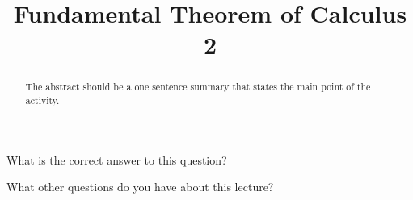 \documentclass{ximera}
\title{Fundamental Theorem of Calculus 2}
\begin{document}
\begin{abstract}
  The abstract should be a one sentence summary that states the main point of the activity.
\end{abstract}

\maketitle

\begin{question}
  What is the correct answer to this question?

  
    \begin{multipleChoice}
    \end{multipleChoice}  
  
\end{question}

What other questions do you have about this lecture?
\begin{question}
  \begin{freeResponse}
  \end{freeRepsonse}
\end{question}
\end{document}
